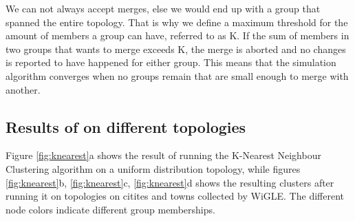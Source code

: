 We can not always accept merges, else we would end up with a group that spanned the entire topology. That is why we define a maximum threshold for the amount of members a group can have, 
referred to as K. If the sum of members in two groups that wants to merge exceeds K, the merge is aborted and no changes is reported to have happened for either group. 
This means that the simulation algorithm converges when no groups remain that are small enough to merge with another.
 
\subsection{Results of on different topologies}
Figure \ref{fig:knearest}a shows the result of running the K-Nearest Neighbour Clustering algorithm on a uniform distribution topology, while figures \ref{fig:knearest}b, \ref{fig:knearest}c, \ref{fig:knearest}d shows the resulting clusters after running it on topologies on citites and towns collected by WiGLE. The different node colors indicate different group memberships.
%
